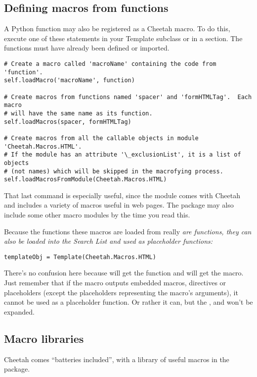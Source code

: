 

\subsection{Defining macros from functions}

A Python function may also be registered as a Cheetah macro.  To do this,
execute one of these statements in your Template subclass or in a 
 section.  The functions must have already been defined or 
imported.

\begin{verbatim}
# Create a macro called 'macroName' containing the code from 'function'.
self.loadMacro('macroName', function)

# Create macros from functions named 'spacer' and 'formHTMLTag'.  Each macro
# will have the same name as its function.
self.loadMacros(spacer, formHTMLTag)

# Create macros from all the callable objects in module 'Cheetah.Macros.HTML'.
# If the module has an attribute '\_exclusionList', it is a list of objects
# (not names) which will be skipped in the macrofying process.
self.loadMacrosFromModule(Cheetah.Macros.HTML)
\end{verbatim}

That last command is especially useful, since the 
module comes with Cheetah and includes a variety of macros useful in web
pages.  The  package may also include some other macro
modules by the time you read this.

Because the functions these macros are loaded from really \em{are} functions,
they can also be loaded into the Search List and used as placeholder functions:

\begin{verbatim}
templateObj = Template(Cheetah.Macros.HTML)
\end{verbatim}

There's no confusion here because  will get the function and
 will get the macro.  Just remember that if the macro
outputs embedded macros, directives or placeholders (except the placeholders
representing the macro's arguments), it cannot be used as a placeholder
function.  Or rather it can, but the ,  and 
won't be expanded.


\subsection{Macro libraries}
\label{macros.libraries}

Cheetah comes ``batteries included'', with a library of useful macros in the
 package.  
